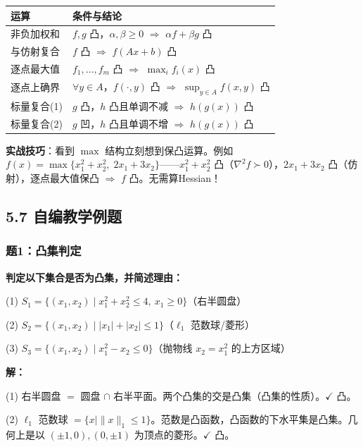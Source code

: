 {\small
\begin{tabular}{@{}ll@{}}
\toprule
\textbf{运算} & \textbf{条件与结论} \\
\midrule
非负加权和  & $f,g$ 凸，$\alpha,\beta \ge 0$ $\Rightarrow$ $\alpha f+\beta g$ 凸 \\
与仿射复合  & $f$ 凸 $\Rightarrow$ $f(Ax+b)$ 凸 \\
逐点最大值  & $f_1,\dots,f_m$ 凸 $\Rightarrow$ $\max_i f_i(x)$ 凸 \\
逐点上确界  & $\forall y\in A$，$f(\cdot,y)$ 凸 $\Rightarrow$ $\sup_{y\in A} f(x,y)$ 凸 \\
标量复合(1) & $g$ 凸，$h$ 凸且单调不减 $\Rightarrow$ $h(g(x))$ 凸 \\
标量复合(2) & $g$ 凹，$h$ 凸且单调不增 $\Rightarrow$ $h(g(x))$ 凸 \\
\bottomrule
\end{tabular}
}

\bigskip

\begin{notebox}
\textbf{实战技巧}：看到 $\max$ 结构立刻想到保凸运算。例如 $f(x)=\max\{x_1^2+x_2^2,\; 2x_1+3x_2\}$——$x_1^2+x_2^2$ 凸（$\nabla^2 f \succ 0$），$2x_1+3x_2$ 凸（仿射），逐点最大值保凸 $\Rightarrow$ $f$ 凸。无需算Hessian！
\end{notebox}

\subsection{5.7 自编教学例题}

\subsubsection{题1：凸集判定}

\textbf{判定以下集合是否为凸集，并简述理由：}

(1) $S_1 = \{(x_1,x_2) \mid x_1^2 + x_2^2 \le 4,\ x_1 \ge 0\}$（右半圆盘）

(2) $S_2 = \{(x_1,x_2) \mid |x_1| + |x_2| \le 1\}$（$\ell_1$ 范数球/菱形）

(3) $S_3 = \{(x_1,x_2) \mid x_1^2 - x_2 \le 0\}$（抛物线 $x_2=x_1^2$ 的上方区域）

\medskip
\textbf{解：}

(1) 右半圆盘 $=$ 圆盘 $\cap$ 右半平面。两个凸集的交是凸集（凸集的性质）。$\checkmark$ 凸。

(2) $\ell_1$ 范数球 $=\{x \mid \|x\|_1 \le 1\}$。范数是凸函数，凸函数的下水平集是凸集。几何上是以 $(\pm1,0),(0,\pm1)$ 为顶点的菱形。$\checkmark$ 凸。

